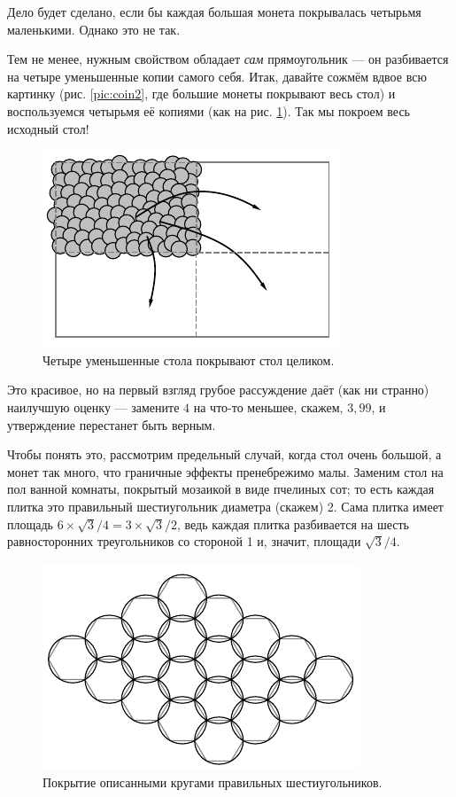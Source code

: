 Дело будет сделано, если бы каждая большая монета покрывалась четырьмя маленькими.
Однако это не так.

Тем не менее, нужным свойством обладает \emph{сам} прямоугольник --- он разбивается на четыре уменьшенные копии самого себя.
Итак, давайте сожмём вдвое всю картинку (рис. \ref{pic:coin2}, где большие монеты покрывают весь стол) и воспользуемся четырьмя её копиями (как на рис. \ref{pic:coin3}).
Так мы покроем весь исходный стол!


\begin{figure}[t!]
\centering
\includegraphics[scale=1]{pics/coin3}
\caption{Четыре уменьшенные стола покрывают стол целиком.}
\label{pic:coin3}
\end{figure}

\medskip

Это красивое, но на первый взгляд грубое рассуждение даёт (как ни странно) наилучшую оценку --- замените $4$ на что-то меньшее, скажем, $3{,}99$, и утверждение перестанет быть верным.

Чтобы понять это, рассмотрим предельный случай, когда стол очень большой, а монет так много, что граничные эффекты пренебрежимо малы.
Заменим стол на пол ванной комнаты, покрытый мозаикой в виде пчелиных сот;
то есть каждая плитка это правильный шестиугольник диаметра (скажем) 2.
Сама плитка имеет площадь $6\times\sqrt{3}/4=3\times\sqrt{3}/2$, ведь каждая плитка разбивается на шесть равносторонних треугольников со стороной 1 и, значит, площади $\sqrt{3}/4$.

\begin{figure}[t!]
\centering
\includegraphics[scale=1]{pics/coin4}
\caption{Покрытие описанными кругами правильных шестиугольников.}
\label{pic:coin4}
\end{figure}

